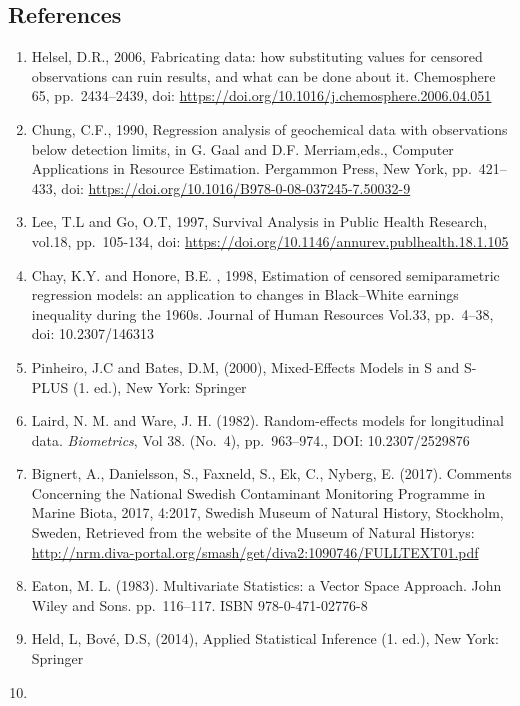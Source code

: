 \documentclass[]{article}
\begin{document}
\hypertarget{references}{%
\subsection{References}\label{references}}

\begin{enumerate}
\def\labelenumi{\arabic{enumi})}
\item
  Helsel, D.R., 2006, Fabricating data: how substituting values for
  censored observations can ruin results, and what can be done about it.
  Chemosphere 65, pp.~2434--2439, doi:
  \url{https://doi.org/10.1016/j.chemosphere.2006.04.051}
\item
  Chung, C.F., 1990, Regression analysis of geochemical data with
  observations below detection limits, in G. Gaal and D.F. Merriam,eds.,
  Computer Applications in Resource Estimation. Pergammon Press, New
  York, pp.~421--433, doi:
  \url{https://doi.org/10.1016/B978-0-08-037245-7.50032-9}
\item
  Lee, T.L and Go, O.T, 1997, Survival Analysis in Public Health
  Research, vol.18, pp.~105-134, doi:
  \url{https://doi.org/10.1146/annurev.publhealth.18.1.105}
\item
  Chay, K.Y. and Honore, B.E. , 1998, Estimation of censored
  semiparametric regression models: an application to changes in
  Black--White earnings inequality during the 1960s. Journal of Human
  Resources Vol.33, pp.~4--38, doi: 10.2307/146313
\item
  Pinheiro, J.C and Bates, D.M, (2000), Mixed-Effects Models in S and
  S-PLUS (1. ed.), New York: Springer
\item
  Laird, N. M. and Ware, J. H. (1982). Random-effects models for
  longitudinal data. \emph{Biometrics}, Vol 38. (No.~4), pp.~963--974.,
  DOI: 10.2307/2529876
\item
  Bignert, A., Danielsson, S., Faxneld, S., Ek, C., Nyberg, E. (2017).
  Comments Concerning the National Swedish Contaminant Monitoring
  Programme in Marine Biota, 2017, 4:2017, Swedish Museum of Natural
  History, Stockholm, Sweden, Retrieved from the website of the Museum
  of Natural Historys:
  \url{http://nrm.diva-portal.org/smash/get/diva2:1090746/FULLTEXT01.pdf}
\item
  Eaton, M. L. (1983). Multivariate Statistics: a Vector Space Approach.
  John Wiley and Sons. pp.~116--117. ISBN 978-0-471-02776-8
\item
  Held, L, Bové, D.S, (2014), Applied Statistical Inference (1. ed.),
  New York: Springer
\item

\end{enumerate}
\end{document}
